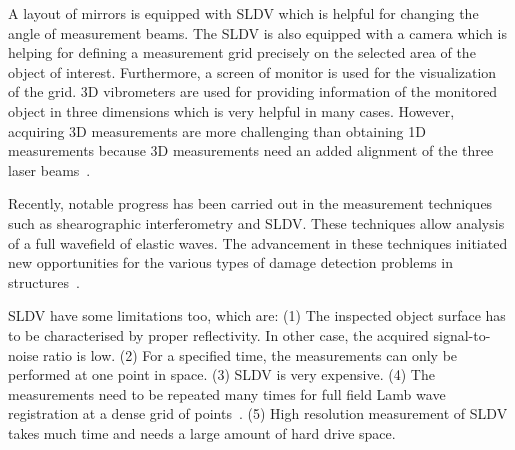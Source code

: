 \documentclass[b5paper, 11pt, titlepage]{book}
\begin{document}
A layout of mirrors is equipped with SLDV which is helpful for changing the angle of measurement beams. The SLDV is also equipped with a camera which is helping for defining a measurement grid precisely on the selected area of the object of interest. Furthermore, a screen of monitor is used for the visualization of the grid. 3D vibrometers are used for providing information of the monitored object in three dimensions which is very helpful in many cases. However, acquiring 3D measurements are more challenging than obtaining 1D measurements because 3D measurements need an added alignment of the three laser beams~\cite{Ostachowicz2014}.

Recently, notable progress has been carried out in the measurement techniques such as shearographic interferometry and SLDV. These techniques allow analysis of a full wavefield of elastic waves. The advancement in these techniques initiated new opportunities for the various types of damage detection problems in structures~\cite{Mitra2016}.

SLDV have some limitations too, which are: (1) The inspected object surface has to be characterised by proper reflectivity. In other case, the acquired signal-to-noise ratio is low. (2) For a specified time, the measurements can only be performed at one point in space. (3) SLDV is very expensive. (4) The measurements need to be repeated many times for full field Lamb wave registration at a dense grid of points~\cite{Ostachowicz2014}.
(5) High resolution measurement of SLDV takes much time and needs a large amount of hard drive space.
\end{document}
